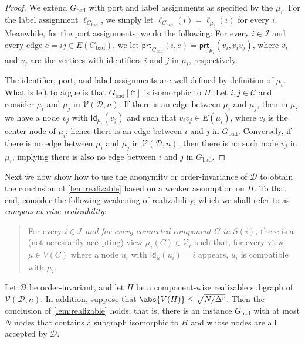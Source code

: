 \documentclass[11pt]{article}
\newcommand*{\alvgd}{\mathcal{V}(\mathcal{D},n)}
\newcommand*{\bad}{\mathrm{bad}}
\newcommand*{\ids}{\mathsf{Id}}
\newcommand*{\ports}{\mathsf{prt}}
\begin{document}
\begin{proof}
  We extend $G_\bad$ with port and label assignments as specified by the
  $\mu_i$.
  For the label assignment $\ell_{G_\bad}$, we simply let $\ell_{G_\bad}(i) =
  \ell_{\mu_i}(i)$ for every $i$.
  Meanwhile, for the port assignments, we do the following: 
  For every $i \in \mathcal{I}$ and every edge $e = ij \in E(G_\bad)$, we let
  $\ports_{G_\bad}(i, e) = \ports_{\mu_i}(v_i, v_iv_j)$, where $v_i$ and $v_j$
  are the vertices with identifiers $i$ and $j$ in $\mu_i$, respectively.

  The identifier, port, and label assignments are well-defined by definition of
  $\mu_i$.
  What is left to argue is that $G_\bad[\mathcal{C}]$ is isomorphic to $H$:
  Let $i,j \in \mathcal{C}$ and consider $\mu_i$ and $\mu_j$ in $\alvgd$.
  If there is an edge between $\mu_i$ and $\mu_j$, then in $\mu_i$ we have a
  node $v_j$ with $\ids_{\mu_i}(v_j)$ and such that $v_iv_j \in E(\mu_i)$, where
  $v_i$ is the center node of $\mu_i$; hence there is an edge between $i$ and
  $j$ in $G_\bad$.
  Conversely, if there is no edge between $\mu_i$ and $\mu_j$ in $\alvgd$, then
  there is no such node $v_j$ in $\mu_i$, implying there is also no edge between
  $i$ and $j$ in $G_\bad$.
\end{proof}

Next we now show how to use the anonymity or order-invariance of $\mathcal{D}$
to obtain the conclusion of \cref{lem:realizable} based on a weaker assumption
on $H$.
To that end, consider the following weakening of realizability, which we shall
refer to as \emph{component-wise realizability}:
\begin{quote}
  For every $i \in \mathcal{I}$ \emph{and for every connected component $C$ in
  $S(i)$,} there is a (not necessarily accepting) view $\mu_i(C) \in
  \mathcal{V}_r$ such that, for every view $\mu \in V(C)$ where a node $u_i$
  with $\ids_\mu(u_i) = i$ appears, $u_i$ is compatible with $\mu_i$.
\end{quote}

\begin{lemma}
  \label{lem:realizable-oi}
  Let $\mathcal{D}$ be order-invariant, and let $H$ be a component-wise
  realizable subgraph of $\alvgd$.
  In addition, suppose that $\abs{V(H)} \le \sqrt{N / \Delta^r}$.
  Then the conclusion of \cref{lem:realizable} holds; that is, there is an
  instance $G_\bad$ with at most $N$ nodes that contains a subgraph isomorphic
  to $H$ and whose nodes are all accepted by $\mathcal{D}$.
\end{lemma}
\end{document}
